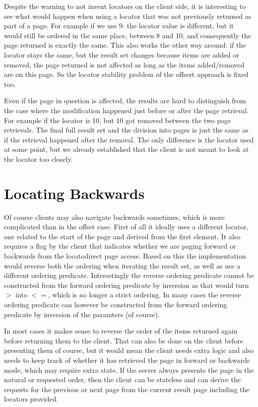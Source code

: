 \documentclass[11pt,a4paper]{article}
\begin{document}
\begin{multicols}{2}
Despite the warning to not invent locators on the client side, it is interesting 
to see what would happen when using a locator that was not previously returned as part of a page. For example 
if we use 9: the locator value is different, but it would still be ordered in the same
place, between 8 and 10, and consequently the page returned is exactly the same.
This also works the other way around: if the locator stays the same, but the
result set changes because items are added or removed, the page returned is not
affected as long as the items added/removed are on this page. So the locator
stability problem of the offsert approach is fixed too.

Even if the page in question is affected, the results are hard to distinguish
from the case where the modification happened just before or after the page
retrieval. For example if the locator is 10, but 10 got removed between the two
page retrievals. The final full result set and the division into pages is just
the same as if the retrieval happened after the removal. The only difference is
the locator used at some point, but we already established that the client is
not meant to look at the locator too closely.

\section*{Locating Backwards}

Of course clients may also navigate backwards sometimes, which is more
complicated than in the offset case. First of all it ideally uses a different
locator, one related to the start of the page and derived from the first
element. It also requires a flag by the client that indicates whether we are
paging forward or backwards from the locatodirect page access. Based on this the
implementation would reverse both the ordering when iterating the result set, as
well as use a different ordering predicate. Interestingly the reverse ordering
predicate cannot be constructed from the forward ordering predicate by inversion
as that would turn $>$ into $<=$, which is no longer a strict ordering. In many
cases the reverse ordering predicate can however be constructed from the forward
ordering predicate by inversion of the paramters (of course).

In most cases it makes sense to reverse the
order of the items returned again before returning them to the client. That
can also be done on the client before presenting them of course, but it would
mean the client needs extra logic and also needs to keep track of whether it has
retrieved the page in forward or backwards mode, which may require extra state.
If the server always presents the page in the natural or requested order, then
the client can be stateless and can derive the requests for the previous or next
page from the current result page including the locators provided.


\end{multicols}
\end{document}
